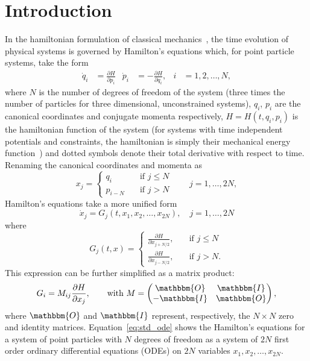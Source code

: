 \documentclass{iopart}
\newcommand{\pd}[2]{\frac{\partial#1}{\partial#2}}
\begin{document}
\section{Introduction}
In the hamiltonian formulation of classical mechanics~\cite{gol:1980, fw:2003},
the time evolution of physical systems is governed by Hamilton's equations
which, for point particle systems, take the form
\begin{align}\label{eq:heqs}
  \dot q_i&=\pd{H}{p_i}&
  \dot p_i&=-\pd{H}{q_i},&
  i&=1, 2, \ldots, N,
\end{align}
where $N$ is the number of degrees of freedom of the system (three times the
number of particles for three dimensional, unconstrained systems), $q_i$, $p_i$
are the canonical coordinates and conjugate momenta respectively, $H=H(t, q_i,
p_i)$ is the hamiltonian function of the system (for systems with time
independent potentials and constraints, the hamiltonian is simply their
mechanical energy function~\cite{fw:2003}) and dotted symbols denote their
total derivative with respect to time. 
Renaming the canonical coordinates and momenta as
\begin{equation}
  x_j = 
  \begin{cases}
    q_i&\quad\text{if }j\leq N\\
    p_{i-N}&\quad\text{if }j> N
  \end{cases}
  \qquad j=1, \ldots, 2N,
\end{equation}
Hamilton's equations take a more unified form
\begin{equation}\label{eq:std_ode}
  \dot x_j=G_j(t, x_1, x_2, \ldots, x_{2N}),\quad j=1, \ldots, 2N
\end{equation}
where
\begin{equation}
  G_j(t, x)=
  \begin{cases}
    \frac{\partial H}{\partial x_{j+N/2}},&\quad\text{if }j\leq N\\
    \frac{\partial H}{\partial x_{j-N/2}},&\quad\text{if }j> N.
  \end{cases}
\end{equation}
This expression can be further simplified as a matrix product:
\begin{equation}\label{eq:rhsmf}
  G_i=M_{i j}\frac{\partial H}{\partial x_j},\qquad
  \text{with }
  M=
  \begin{pmatrix}
    \mathbbm{O}&\mathbbm{I}\\
    -\mathbbm{I}&\mathbbm{O}
  \end{pmatrix},
\end{equation}
where $\mathbbm{O}$ and $\mathbbm{I}$ represent, respectively, the $N\times N$
zero and identity matrices.  Equation~\eqref{eq:std_ode} shows the Hamilton's
equations for a system of point particles with $N$ degrees of freedom as a
system of $2N$ first order ordinary differential equations (ODEs) on $2N$
variables $x_1, x_2, \ldots, x_{2N}$.
\end{document}
